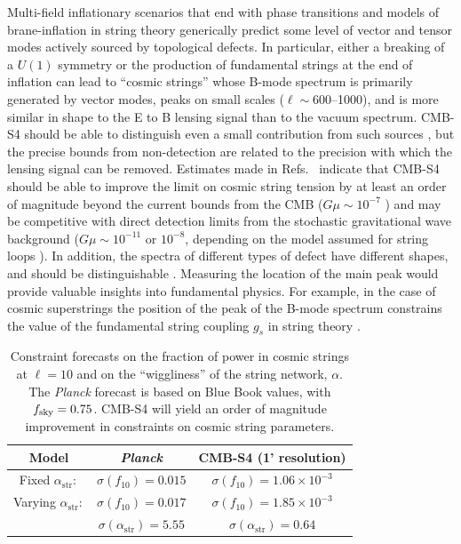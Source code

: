 Multi-field inflationary scenarios that end with phase transitions \cite{Hindmarsh:1994re,Vilenkin:1981iu,Kofman:1995fi,Tkachev:1998dc,Jeannerot:1995yn,Jeannerot:2003qv,Rocher:2004my} and models of brane-inflation in string theory \cite{Sarangi:2002yt,Jones:2003da,Copeland:2003bj} generically predict some level of vector and tensor modes actively sourced by topological defects. In particular, either a breaking of a $U(1)$ symmetry or the production of fundamental strings at the end of inflation can lead to ``cosmic strings'' whose B-mode spectrum is primarily generated by vector modes, peaks on small scales ($\ell\sim 600$--1000), and is more similar in shape to the E to B lensing signal than to the vacuum spectrum. CMB-S4 should be able to distinguish even a small contribution from such sources \cite{Urrestilla:2008jv}, but the precise bounds from non-detection are related to the precision with which the lensing signal can be removed. Estimates made in Refs.~\cite{Seljak:2006hi,Avgoustidis:2011ax} indicate that CMB-S4 should be able to improve the limit on cosmic string tension by at least an order of magnitude beyond the current bounds from the CMB ($G\mu\sim10^{-7}$ \cite{Ade:2013xla,Ade:2015ava,Ade:2015xua}) and may be competitive with direct detection limits from the stochastic gravitational wave background ($G\mu\sim10^{-11}$ or $10^{-8}$, depending on the model assumed for string loops \cite{Arzoumanian:2015liz}). In addition, the spectra of different types of defect have different shapes, and should be distinguishable \cite{Urrestilla:2007sf,Avgoustidis:2011ax}. Measuring the location of the main peak would provide valuable insights into fundamental physics. For example, in the case of cosmic superstrings the position of the peak of the B-mode spectrum constrains the value of the fundamental string coupling $g_s$ in string theory \cite{Avgoustidis:2011ax}. 

\begin{table}[htbp!]\label{tab:string_forecast}
  \begin{center}
    \begin{tabular}{ c || c | c }
      \hline
       Model & {\it Planck} & CMB-S4 (1' resolution)  \\ \hline \hline
       Fixed $\alpha_\mathrm{str}:$ & $\sigma(f_{10})= 0.015$ & $\sigma(f_{10})=1.06\times 10^{-3}$  \\ \hline
       Varying $\alpha_\mathrm{str}:$ & $\sigma(f_{10})= 0.017$ & $\sigma(f_{10})=1.85\times 10^{-3}$ \\
        & $\sigma(\alpha_\mathrm{str})= 5.55$ & $\sigma(\alpha_\mathrm{str})=0.64$ \\\hline \hline
    \end{tabular}
  \end{center}
  \caption{Constraint forecasts on the fraction of power in cosmic strings at $\ell=10$ and on the ``wiggliness'' of the string network, $\alpha$. The {\it Planck\/} forecast is based on Blue Book values, with $f_{\rm sky} = 0.75$. CMB-S4 will yield an order of magnitude improvement in constraints on cosmic string parameters.}
\end{table}

